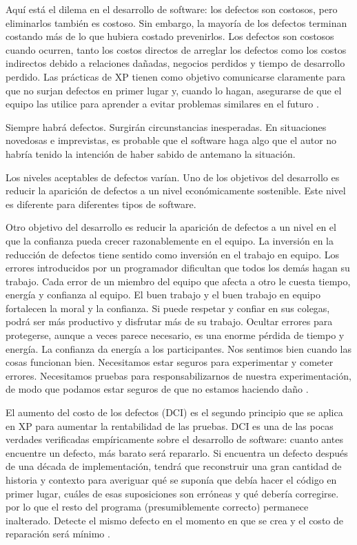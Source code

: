 \begin{spacing}{1.5}
				Aquí está el dilema en el desarrollo de software: los defectos son costosos, pero eliminarlos también es costoso. Sin embargo, la mayoría de los defectos terminan costando más de lo que hubiera costado prevenirlos. Los defectos son costosos cuando ocurren, tanto los costos directos de arreglar los defectos como los costos indirectos debido a relaciones dañadas, negocios perdidos y tiempo de desarrollo perdido. Las prácticas de XP tienen como objetivo comunicarse claramente para que no surjan defectos en primer lugar y, cuando lo hagan, asegurarse de que el equipo las utilice para aprender a evitar problemas similares en el futuro \cite{chap2_extreme_programming}.
				
				Siempre habrá defectos. Surgirán circunstancias inesperadas. En situaciones novedosas e imprevistas, es probable que el software haga algo que el autor no habría tenido la intención de haber sabido de antemano la situación.
				
				Los niveles aceptables de defectos varían. Uno de los objetivos del desarrollo es reducir la aparición de defectos a un nivel económicamente sostenible. Este nivel es diferente para diferentes tipos de software.
				
				Otro objetivo del desarrollo es reducir la aparición de defectos a un nivel en el que la confianza pueda crecer razonablemente en el equipo. La inversión en la reducción de defectos tiene sentido como inversión en el trabajo en equipo. Los errores introducidos por un programador dificultan que todos los demás hagan su trabajo. Cada error de un miembro del equipo que afecta a otro le cuesta tiempo, energía y confianza al equipo. El buen trabajo y el buen trabajo en equipo fortalecen la moral y la confianza. Si puede respetar y confiar en sus colegas, podrá ser más productivo y disfrutar más de su trabajo. Ocultar errores para protegerse, aunque a veces parece necesario, es una enorme pérdida de tiempo y energía. La confianza da energía a los participantes. Nos sentimos bien cuando las cosas funcionan bien. Necesitamos estar seguros para experimentar y cometer errores. Necesitamos pruebas para responsabilizarnos de nuestra experimentación, de modo que podamos estar seguros de que no estamos haciendo daño \cite{chap2_extreme_programming}.
				
				El aumento del costo de los defectos (DCI) es el segundo principio que se aplica en XP para aumentar la rentabilidad de las pruebas. DCI es una de las pocas verdades verificadas empíricamente sobre el desarrollo de software: cuanto antes encuentre un defecto, más barato será repararlo. Si encuentra un defecto después de una década de implementación, tendrá que reconstruir una gran cantidad de historia y contexto para averiguar qué se suponía que debía hacer el código en primer lugar, cuáles de esas suposiciones son erróneas y qué debería corregirse. por lo que el resto del programa (presumiblemente correcto) permanece inalterado. Detecte el mismo defecto en el momento en que se crea y el costo de reparación será mínimo \cite{chap2_extreme_programming}.
				

\end{spacing}
